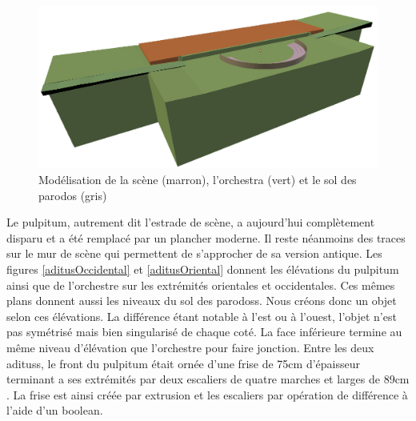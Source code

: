 \begin{figure}[!h]
	\includegraphics[width=\linewidth]{images/modOrchestre}
	\caption[Modélisation de la scène, l'\gls{orchestra} et le sol des \gls{parodos}]{Modélisation de la scène (marron), l'\gls{orchestra} (vert) et le sol des \gls{parodos} (gris)} 
	\label{modOrchestre} 
\end{figure} 

Le \gls{pulpitum}, autrement dit l'estrade de scène, a aujourd'hui complètement disparu et a été remplacé par un plancher moderne. Il reste néanmoins des traces sur le mur de scène qui permettent de s'approcher de sa version antique. Les figures \ref{aditusOccidental} et \ref{aditusOriental} donnent les élévations du pulpitum ainsi que de l'orchestre sur les extrémités orientales et occidentales. Ces mêmes plans donnent aussi les niveaux du sol des \glspl{parodos}. Nous créons donc un objet selon ces élévations. La différence étant notable à l'est ou à l'ouest, l'objet n'est pas symétrisé mais bien singularisé de chaque coté. La face inférieure termine au même niveau d'élévation que l'orchestre pour faire jonction. Entre les deux \glspl{aditus}, le front du \gls{pulpitum} était ornée d'une frise de 75cm d'épaisseur terminant a ses extrémités par deux escaliers de quatre marches et larges de 89cm \cite[p. 458]{formigeBis}. La frise est ainsi créée par extrusion et les escaliers par opération de différence à l'aide d'un \gls{boolean}.

